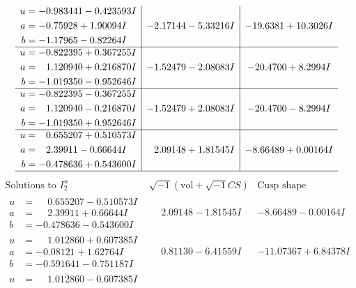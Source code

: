 \documentclass[1p]{elsarticle_modified}
\theoremstyle{definition}
\newcommand{\I}{\sqrt{-1}}
\begin{document}
$$\begin{array}{c|c|c}
\begin{aligned}
u &= -0.983441 - 0.423593 I \\
a &= -0.75928 + 1.90094 I \\
b &= -1.17965 - 0.82264 I\end{aligned}
 & -2.17144 - 5.33216 I & -19.6381 + 10.3026 I \\ \hline\begin{aligned}
u &= -0.822395 + 0.367255 I \\
a &= \phantom{-}1.120940 + 0.216870 I \\
b &= -1.019350 - 0.952646 I\end{aligned}
 & -1.52479 - 2.08083 I & -20.4700 + 8.2994 I \\ \hline\begin{aligned}
u &= -0.822395 - 0.367255 I \\
a &= \phantom{-}1.120940 - 0.216870 I \\
b &= -1.019350 + 0.952646 I\end{aligned}
 & -1.52479 + 2.08083 I & -20.4700 - 8.2994 I \\ \hline\begin{aligned}
u &= \phantom{-}0.655207 + 0.510573 I \\
a &= \phantom{-}2.39911 - 0.66644 I \\
b &= -0.478636 + 0.543600 I\end{aligned}
 & \phantom{-}2.09148 + 1.81545 I & -8.66489 + 0.00164 I\\
 \hline 
 \end{array}$$\newpage$$\begin{array}{c|c|c}  
\text{Solutions to }I^u_{2}& \I (\text{vol} + \sqrt{-1}CS) & \text{Cusp shape}\\
 \hline 
\begin{aligned}
u &= \phantom{-}0.655207 - 0.510573 I \\
a &= \phantom{-}2.39911 + 0.66644 I \\
b &= -0.478636 - 0.543600 I\end{aligned}
 & \phantom{-}2.09148 - 1.81545 I & -8.66489 - 0.00164 I \\ \hline\begin{aligned}
u &= \phantom{-}1.012860 + 0.607385 I \\
a &= -0.08121 + 1.62764 I \\
b &= -0.591641 - 0.751187 I\end{aligned}
 & \phantom{-}0.81130 - 6.41559 I & -11.07367 + 6.84378 I \\ \hline\begin{aligned}
u &= \phantom{-}1.012860 - 0.607385 I \\

\end{aligned}
\end{array}$$
\end{document}
